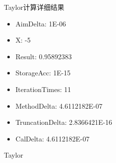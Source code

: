 \documentclass[lang=cn,11pt,a4paper]{elegantpaper}
\begin{document}
\begin{figure}[htbp]
\begin{minipage}[htbp]{0.4\linewidth}
    \caption{Taylor}
    \centering
  \end{minipage}
  \hfill
  \begin{minipage}[htbp]{0.5\linewidth}
    Taylor计算详细结果
    \begin{itemize}
      \item AimDelta: 1E-06
      \item X: -5
      \item Result: 0.95892383
      \item StorageAcc: 1E-15
      \item IterationTimes: 11
      \item MethodDelta: 4.6112182E-07
      \item TruncationDelta: 2.8366421E-16
      \item CalDelta: 4.6112182E-07
    \end{itemize}
  \end{minipage}
\end{figure}
\end{document}
